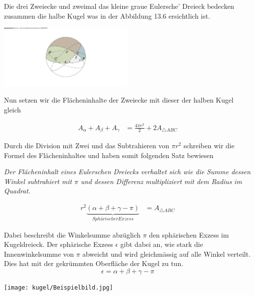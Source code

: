 \begin{refsection}
Die drei Zweiecke und zweimal das kleine graue Eulersche’ Dreieck bedecken zusammen  die halbe Kugel was in der Abbildung 13.6 ersichtlich ist.

\begin{center}
        \includegraphics[width=0.5\textwidth]{kugel/1HalbeKugel.jpg}
\end{center}

Nun setzen wir die Flächeninhalte der Zweiecke mit dieser der halben Kugel gleich

\begin{align*}
A_{ \alpha } + A_{ \beta } + A_{ \gamma } &= \frac{ 4\pi r^{ 2 } }{ 2 } + 2A_{ \triangle{ ABC }}
\end{align*}

Durch die Division mit Zwei und das Subtrahieren von $\pi r^2$ schreiben wir die Formel des Flächeninhaltes und haben somit folgenden Satz bewiesen

\begin{satz} \textit{Der Flächeninhalt eines Eulerschen Dreiecks verhaltet sich wie die Summe dessen Winkel subtrahiert mit $\pi$ und dessen Differenz multipliziert mit dem Radius im Quadrat.}
\label{skript:kugel:satz:Flaecheninhalt}
\end{satz}

\begin{align*}
r^{ 2 }\underbrace{(\alpha + \beta + \gamma - \pi)}_{Sphärischer Exzess} &= A_{ \triangle{ ABC }}  
\end{align*}

Dabei beschreibt die Winkelsumme abzüglich $\pi$ den sphärischen Exzess im Kugeldreieck.
Der sphärische Exzess $\epsilon$ gibt dabei an, wie stark die Innenwinkelsumme von $\pi$ abweicht und wird gleichmässig auf alle Winkel verteilt. Dies hat mit der gekrümmten Oberfläche der Kugel zu tun.
\begin{equation}
\epsilon = \alpha + \beta + \gamma - \pi
\end{equation}

\begin{center}
        \texttt{[image: kugel/Beispielbild.jpg]}
\end{center}


\end{refsection}
